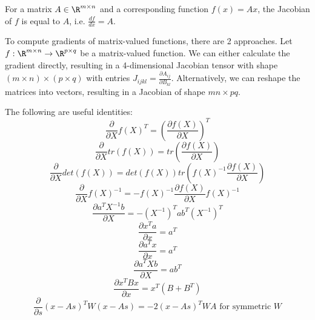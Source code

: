 For a matrix $A \in \R^{m \times n}$ and a corresponding function $f(x) = Ax$,
the Jacobian of $f$ is equal to $A$,
i.e. $\frac{d f}{d x} = A$.

To compute gradients of matrix-valued functions, there are 2 approaches.
Let $f : \R^{m \times n} \to \R^{p \times q}$ be a matrix-valued function.
We can either calculate the gradient directly, resulting in a 4-dimensional Jacobian tensor
with shape $(m \times n) \times (p \times q)$ with entries
$J_{ijkl} = \frac{\partial A_{ij}}{\partial B_{kl}}$.
Alternatively, we can reshape the matrices into vectors,
resulting in a Jacobian of shape $mn \times pq$.

The following are useful identities:
\begin{equation*}
    \frac{\partial}{\partial X} f(X)^T = \left( \frac{\partial f(X)}{\partial X} \right)^T
\end{equation*}
\begin{equation*}
    \frac{\partial}{\partial X} tr(f(X)) = tr\left( \frac{\partial f(X)}{\partial X} \right)
\end{equation*}
\begin{equation*}
    \frac{\partial}{\partial X} det(f(X)) = det(f(X)) tr\left( f(X)^{-1} \frac{\partial f(X)}{\partial X} \right)
\end{equation*}
\begin{equation*}
    \frac{\partial}{\partial X} f(X)^{-1} = -f(X)^{-1} \frac{\partial f(X)}{\partial X} f(X)^{-1} 
\end{equation*}
\begin{equation*}
    \frac{\partial a^T X^{-1} b}{\partial X}
    = -(X^{-1})^T ab^T (X^{-1})^T
\end{equation*}
\begin{equation*}
    \frac{\partial x^T a}{\partial x} = a^T
\end{equation*}
\begin{equation*}
    \frac{\partial a^T x}{\partial x} = a^T
\end{equation*}
\begin{equation*}
    \frac{\partial a^T X b}{\partial X} = ab^T
\end{equation*}
\begin{equation*}
    \frac{\partial x^T B x}{\partial x} = x^T (B + B^T)
\end{equation*}
\begin{equation*}
    \frac{\partial}{\partial s} (x - As)^T W (x - As)
    = -2 (x - As)^T W A \text{ for symmetric $W$}
\end{equation*}

